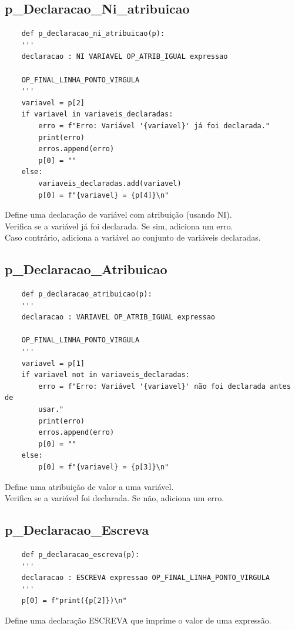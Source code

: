 \documentclass[a4paper,12pt]{article}
\begin{document}
\subsection{p\_Declaracao\_Ni\_atribuicao}
\begin{verbatim}
    def p_declaracao_ni_atribuicao(p):
    '''
    declaracao : NI VARIAVEL OP_ATRIB_IGUAL expressao 
    
    OP_FINAL_LINHA_PONTO_VIRGULA
    '''
    variavel = p[2]
    if variavel in variaveis_declaradas:
        erro = f"Erro: Variável '{variavel}' já foi declarada."
        print(erro)
        erros.append(erro)
        p[0] = ""
    else:
        variaveis_declaradas.add(variavel)
        p[0] = f"{variavel} = {p[4]}\n"
\end{verbatim}
Define uma declaração de variável com atribuição (usando NI).\\
Verifica se a variável já foi declarada. Se sim, adiciona um erro.\\
Caso contrário, adiciona a variável ao conjunto de variáveis declaradas.

\subsection{p\_Declaracao\_Atribuicao}
\begin{verbatim}
    def p_declaracao_atribuicao(p):
    '''
    declaracao : VARIAVEL OP_ATRIB_IGUAL expressao 
    
    OP_FINAL_LINHA_PONTO_VIRGULA
    '''
    variavel = p[1]
    if variavel not in variaveis_declaradas:
        erro = f"Erro: Variável '{variavel}' não foi declarada antes de 
        usar."
        print(erro)
        erros.append(erro)
        p[0] = ""
    else:
        p[0] = f"{variavel} = {p[3]}\n"
\end{verbatim}
Define uma atribuição de valor a uma variável.\\
Verifica se a variável foi declarada. Se não, adiciona um erro.

\subsection{p\_Declaracao\_Escreva}
\begin{verbatim}
    def p_declaracao_escreva(p):
    '''
    declaracao : ESCREVA expressao OP_FINAL_LINHA_PONTO_VIRGULA
    '''
    p[0] = f"print({p[2]})\n"
\end{verbatim}
Define uma declaração ESCREVA que imprime o valor de uma expressão.
\end{document}
